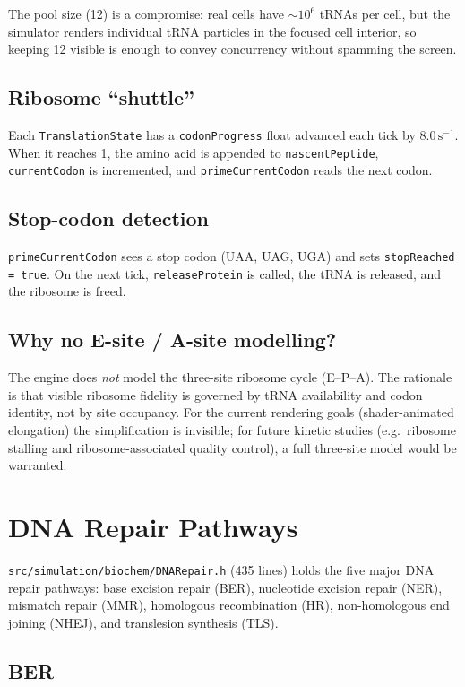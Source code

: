 \documentclass[11pt,letterpaper,twoside,openany]{book}
\newcommand{\code}[1]{\texttt{#1}}
\newcommand{\file}[1]{\texttt{\small#1}}
\begin{document}
The pool size (12) is a compromise: real cells have $\sim 10^6$
tRNAs per cell, but the simulator renders individual tRNA particles
in the focused cell interior, so keeping 12 visible is enough to
convey concurrency without spamming the screen.

\section{Ribosome ``shuttle''}

Each \code{TranslationState} has a \code{codonProgress} float
advanced each tick by $8.0\,\text{s}^{-1}$. When it reaches 1, the
amino acid is appended to \code{nascentPeptide}, \code{currentCodon}
is incremented, and \code{primeCurrentCodon} reads the next codon.

\section{Stop-codon detection}

\code{primeCurrentCodon} sees a stop codon (UAA, UAG, UGA) and sets
\code{stopReached = true}. On the next tick, \code{releaseProtein}
is called, the tRNA is released, and the ribosome is freed.

\section{Why no E-site / A-site modelling?}

The engine does \emph{not} model the three-site ribosome cycle
(E--P--A). The rationale is that visible ribosome fidelity is
governed by tRNA availability and codon identity, not by site
occupancy. For the current rendering goals (shader-animated
elongation) the simplification is invisible; for future kinetic
studies (e.g.\ ribosome stalling and ribosome-associated quality
control), a full three-site model would be warranted.

\chapter{DNA Repair Pathways}
\label{ch:dna-repair}

\file{src/simulation/biochem/DNARepair.h} (435 lines) holds the
five major DNA repair pathways: base excision repair (BER),
nucleotide excision repair (NER), mismatch repair (MMR),
homologous recombination (HR), non-homologous end joining (NHEJ),
and translesion synthesis (TLS).

\section{BER}
\end{document}
